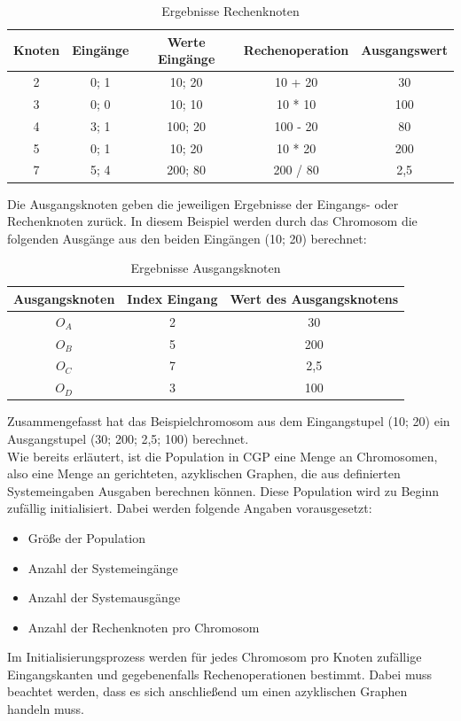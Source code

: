 \begin{table}[H]
    \centering
    \begin{tabular}{c|c|c|c|c}
       \textbf{Knoten} & \textbf{Eingänge} & \textbf{Werte Eingänge} & \textbf{Rechenoperation} & \textbf{Ausgangswert} \\ \hline
        2 & 0; 1 & 10; 20 & 10 + 20 & 30 \\ \hline
        3 & 0; 0 & 10; 10 & 10 * 10 & 100 \\ \hline
        4 & 3; 1 & 100; 20 & 100 - 20 & 80 \\ \hline
        5 & 0; 1 & 10; 20 & 10 * 20 & 200 \\ \hline
        7 & 5; 4 & 200; 80 & 200 / 80 & 2,5
    \end{tabular}
    \caption{Ergebnisse Rechenknoten}
    \label{table:ergebnisseRechenknoten}
\end{table}

Die Ausgangsknoten geben die jeweiligen Ergebnisse der Eingangs- oder Rechenknoten zurück.
In diesem Beispiel werden durch das Chromosom die folgenden Ausgänge aus den beiden Eingängen (10; 20) berechnet:

\begin{table}[H]
    \centering
    \begin{tabular}{c|c|c}
       \textbf{Ausgangsknoten} & \textbf{Index Eingang} & \textbf{Wert des Ausgangsknotens} \\ \hline
        $O_A$ & 2 & 30 \\ \hline
        $O_B$ & 5 & 200 \\ \hline
        $O_C$ & 7 & 2,5 \\ \hline
        $O_D$ & 3 & 100
    \end{tabular}
    \caption{Ergebnisse Ausgangsknoten}
    \label{table:ergebnisseAusgangsknoten}
\end{table}

Zusammengefasst hat das Beispielchromosom aus dem Eingangstupel (10; 20) ein Ausgangstupel (30; 200; 2,5; 100) berechnet.\\

Wie bereits erläutert, ist die Population in CGP eine Menge an Chromosomen, also eine Menge an gerichteten, azyklischen Graphen, die aus definierten Systemeingaben Ausgaben berechnen können.
Diese Population wird zu Beginn zufällig initialisiert.
Dabei werden folgende Angaben vorausgesetzt:
\begin{itemize}
    \item Größe der Population
    \item Anzahl der Systemeingänge
    \item Anzahl der Systemausgänge
    \item Anzahl der Rechenknoten pro Chromosom
\end{itemize}
Im Initialisierungsprozess werden für jedes Chromosom pro Knoten zufällige Eingangskanten und gegebenenfalls Rechenoperationen bestimmt.
Dabei muss beachtet werden, dass es sich anschließend um einen azyklischen Graphen handeln muss.\\

